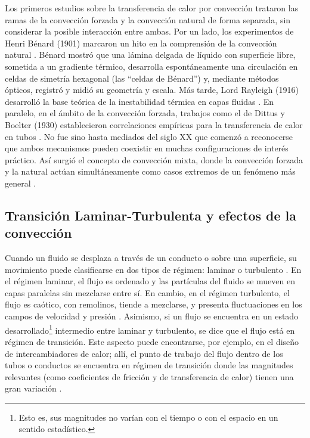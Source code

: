Los primeros estudios sobre la transferencia de calor por convección trataron las ramas de la convección forzada y la convección natural de forma separada, sin considerar \linebreak la posible interacción entre ambas. Por un lado, los experimentos de Henri Bénard (1901) marcaron un hito en la comprensión de la convección natural \cite{benard1901}. Bénard mostró que una lámina delgada de líquido con superficie libre, sometida a un gradiente térmico, desarrolla espontáneamente una circulación en celdas de simetría hexagonal (las ``celdas de Bénard'') y, mediante métodos ópticos, registró y midió su geometría y escala. Más tarde, Lord Rayleigh (1916) desarrolló la base teórica de la inestabilidad térmica en capas fluidas \cite{rayleigh1916}. En paralelo, en el ámbito de la convección forzada, trabajos como el de Dittus y Boelter (1930) establecieron correlaciones empíricas para la transferencia de calor en tubos \cite{dittus1930}. No fue sino hasta mediados del siglo XX que comenzó a reconocerse que ambos mecanismos pueden coexistir en muchas configuraciones de interés práctico. Así surgió el concepto de convección mixta, donde la convección forzada y la natural actúan simultáneamente como casos extremos de un fenómeno más general \cite{metais1964}. 

\subsection*{Transición Laminar-Turbulenta y efectos de la convección}

Cuando un fluido se desplaza a través de un conducto o sobre una superficie, su movimiento puede clasificarse en dos tipos de régimen: laminar o turbulento \cite{white}. En el régimen laminar, el flujo es ordenado y las partículas del fluido se mueven en capas paralelas sin mezclarse entre sí. En cambio, en el régimen turbulento, el flujo es caótico, con remolinos, tiende a mezclarse, y presenta fluctuaciones en los campos de velocidad y presión \cite{kundu}. Asimismo, si un flujo se encuentra en un estado desarrollado\footnote{Esto es, sus magnitudes no varían con el tiempo o con el espacio en un sentido estadístico.} intermedio entre laminar y turbulento, se dice que el flujo está en régimen de transición. Este aspecto puede encontrarse, por ejemplo, en el diseño de intercambiadores de calor; allí, el punto de trabajo del flujo dentro de los tubos o conductos se encuentra en régimen de transición donde las magnitudes relevantes (como coeficientes de fricción y de transferencia de calor) tienen una gran variación \cite{ghajar2019heat}. 

